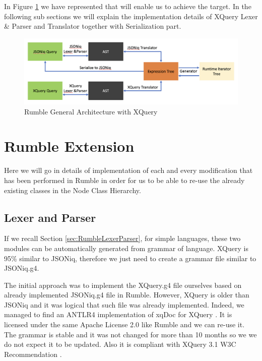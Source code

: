 In Figure \ref{fig:Rumble_General_Architecture_With_XQuery} we have represented that will enable us to achieve the target. In the following sub sections we will explain the implementation details of XQuery Lexer \& Parser and Translator together with Serialization part. 

\begin{figure}[h!]
	\includegraphics[width=\linewidth]{double_parsing_architecture.png}
	\vspace*{-5mm}
	\caption{Rumble General Architecture with XQuery}
	\label{fig:Rumble_General_Architecture_With_XQuery}
\end{figure}

\section{Rumble Extension}
Here we will go in details of implementation of each and every modification that has been performed in Rumble in order for us to be able to re-use the already existing classes in the Node Class Hierarchy. 

\subsection{Lexer and Parser}
If we recall Section \ref{sec:RumbleLexerParser}, for simple languages, these two modules can be automatically generated from grammar of language. XQuery is 95\% similar to JSONiq, therefore we just need to create a grammar file similar to JSONiq.g4. 

The initial approach was to implement the XQuery.g4 file ourselves based on already implemented JSONiq.g4 file in Rumble. However, XQuery is older than JSONiq and it was logical that such file was already implemented. Indeed, we managed to find an ANTLR4 implementation of xqDoc for XQuery \cite{XqueryGrammar}. It is licensed under the same Apache License 2.0 like Rumble and we can re-use it. The grammar is stable and it was not changed for more than 10 months so we we do not expect it to be updated. Also it is compliant with XQuery 3.1 W3C Recommendation \cite{XQueryRecommendation}. 

